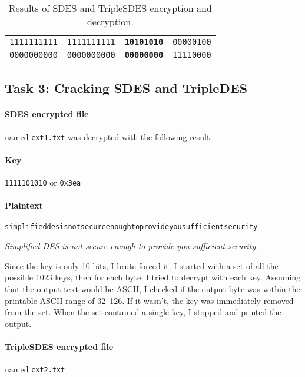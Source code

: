 \documentclass[a4paper,english,12pt]{article}
\begin{document}
\begin{table}
\begin{tabular}{@{}llll@{}}
            \texttt{1111111111} &
            \texttt{1111111111} &
      \texttt{\textbf{10101010}} &
              \texttt{00000100} \\

            \texttt{0000000000} &
            \texttt{0000000000} &
      \texttt{\textbf{00000000}} &
              \texttt{11110000} \\
    \bottomrule
  \end{tabular}
  \caption{Results of SDES and TripleSDES encryption and decryption.}
  \label{table:sdes}
\end{table}

\subsection{Task 3: Cracking SDES and TripleDES}

\paragraph{SDES encrypted file} named \texttt{cxt1.txt} was decrypted with the
following result:

\paragraph{Key} \texttt{1111101010} or \texttt{0x3ea}

\paragraph{Plaintext}
\texttt{simplifieddesisnotsecureenoughtoprovideyousufficientsecurity}

\begin{center}
\textit{Simplified DES is not secure enough to provide you sufficient security.}
\end{center}

Since the key is only 10 bits, I brute-forced it. I started with a set of all
the possible 1023 keys, then for each byte, I tried to decrypt with each key.
Assuming that the output text would be ASCII, I checked if the output byte was
within the printable ASCII range of 32--126. If it wasn't, the key was
immediately removed from the set. When the set contained a single key, I
stopped and printed the output.

\paragraph{TripleSDES encrypted file} named \texttt{cxt2.txt}
\end{document}
